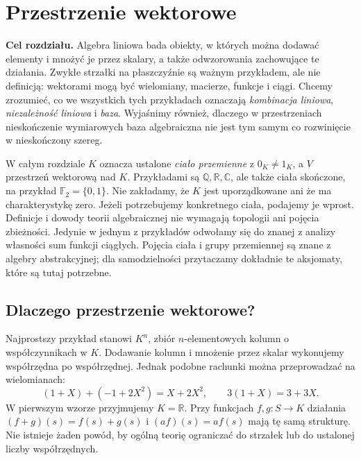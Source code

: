 \chapter{Przestrzenie wektorowe}
\label{ch:lin-przestrzenie-wektorowe}

\providecommand{\atlasref}[2]{#2}


\noindent\textbf{Cel rozdziału.}
Algebra liniowa bada obiekty, w których można dodawać elementy i mnożyć je
przez skalary, a także odwzorowania zachowujące te działania.
Zwykłe strzałki na płaszczyźnie są ważnym przykładem, ale nie definicją:
wektorami mogą być wielomiany, macierze, funkcje i ciągi.
Chcemy zrozumieć, co we wszystkich tych przykładach oznaczają
\emph{kombinacja liniowa}, \emph{niezależność liniowa} i \emph{baza}.
Wyjaśnimy również, dlaczego w przestrzeniach nieskończenie wymiarowych
baza algebraiczna nie jest tym samym co rozwinięcie w nieskończony szereg.

W całym rozdziale \(K\) oznacza ustalone \emph{ciało przemienne}
z \(0_K\neq1_K\), a \(V\) przestrzeń wektorową nad \(K\).
Przykładami są \(\mathbb Q,\mathbb R,\mathbb C\), ale także ciała skończone,
na przykład \(\mathbb F_2=\{0,1\}\).
Nie zakładamy, że \(K\) jest uporządkowane ani że ma charakterystykę zero.
Jeżeli potrzebujemy konkretnego ciała, podajemy je wprost.
Definicje i dowody teorii algebraicznej nie wymagają
topologii ani pojęcia zbieżności.
Jedynie w jednym z przykładów odwołamy się do znanej
z analizy własności sum funkcji ciągłych.
Pojęcia ciała i grupy przemiennej są znane z algebry abstrakcyjnej;
dla samodzielności przytaczamy dokładnie te aksjomaty, które są tutaj potrzebne.

\section{Dlaczego przestrzenie wektorowe?}
\label{sec:lin-motywacja}

Najprostszy przykład stanowi \(K^n\), zbiór \(n\)-elementowych kolumn
o współczynnikach w \(K\). Dodawanie kolumn i mnożenie przez skalar
wykonujemy współrzędna po współrzędnej. Jednak podobne rachunki można
przeprowadzać na wielomianach:
\[
 (1+X)+(-1+2X^2)=X+2X^2,\qquad
 3(1+X)=3+3X .
\]
W pierwszym wzorze przyjmujemy \(K=\mathbb R\).
Przy funkcjach \(f,g\colon S\to K\) działania
\((f+g)(s)=f(s)+g(s)\) i \((af)(s)=af(s)\) mają tę samą
strukturę. Nie istnieje żaden powód, by ogólną teorię
ograniczać do strzałek lub do ustalonej liczby współrzędnych.

